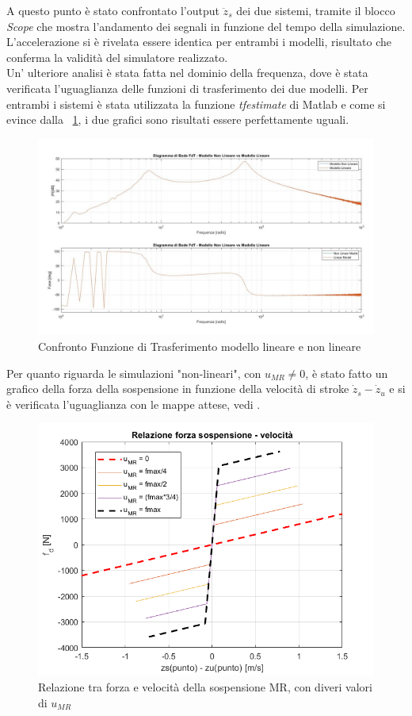 A questo punto è stato confrontato l'output $\ddot{z}_s$ dei due sistemi, tramite il blocco \textit{Scope} che mostra l'andamento dei segnali in funzione del tempo della simulazione. L'accelerazione si è rivelata essere identica per entrambi i modelli, risultato che conferma la validità del simulatore realizzato.\\
Un' ulteriore analisi è stata fatta nel dominio della frequenza, dove è stata verificata l'uguaglianza delle funzioni di trasferimento dei due modelli. Per entrambi i sistemi è stata utilizzata la funzione \textit{tfestimate} di Matlab e come si evince dalla \figurename \ \ref{fig:Fdtconfronto}, i due grafici sono risultati essere perfettamente uguali.
\begin{figure}[hbt]
	\centering
	\includegraphics[scale=0.7]{figure/FdTconfronto.jpg}
	\caption{Confronto Funzione di Trasferimento modello lineare e non lineare}
	\label{fig:Fdtconfronto}
\end{figure}

Per quanto riguarda le simulazioni "non-lineari", con $u_{MR}\neq0$, è stato fatto un grafico della forza della sospensione in funzione della velocità di stroke $\dot{z}_s - \dot{z}_u$ e si è verificata l'uguaglianza con le mappe attese, vedi \cite{controlMRdampers}.
\begin{figure}[hbt]
	\centering
	\includegraphics[scale=0.45]{figure/force-speed graph.png}
	\caption{Relazione tra forza e velocità della sospensione MR, con diveri valori di $u_{MR}$}
	\label{fig:graficofd}
\end{figure}


